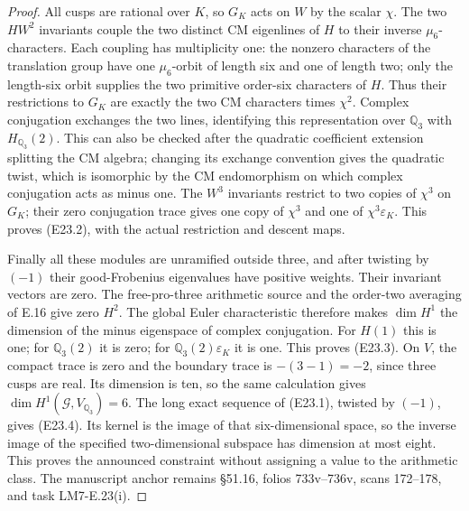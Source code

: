 \documentclass[11pt,oneside]{article}
\begin{document}
\begin{proof}
All cusps are rational over $K$, so $G_K$ acts on $W$ by
the scalar $\chi$. The two $HW^2$ invariants couple the
two distinct CM eigenlines of $H$ to their inverse
$\mu_6$-characters. Each coupling has multiplicity one:
the nonzero characters of the translation group have one
$\mu_6$-orbit of length six and one of length two; only
the length-six orbit supplies the two primitive order-six
characters of $H$. Thus their restrictions to $G_K$ are
exactly the two CM characters times $\chi^2$.
Complex conjugation exchanges the two lines, identifying
this representation over $\mathbb Q_3$ with
$H_{\mathbb Q_3}(2)$. This can also be checked after the
quadratic coefficient extension splitting the CM algebra;
changing its exchange convention gives the quadratic twist,
which is isomorphic by the CM endomorphism on which
complex conjugation acts as minus one.
The $W^3$ invariants restrict to two copies of $\chi^3$
on $G_K$; their zero conjugation trace gives one copy of
$\chi^3$ and one of $\chi^3\varepsilon_K$. This proves
(E23.2), with the actual restriction and descent maps.

Finally all these modules are unramified outside three,
and after twisting by $(-1)$ their good-Frobenius eigenvalues
have positive weights. Their invariant vectors are zero.
The free-pro-three arithmetic source and the order-two
averaging of E.16 give zero $H^2$. The global Euler
characteristic therefore makes $\dim H^1$ the dimension
of the minus eigenspace of complex conjugation.
For $H(1)$ this is one; for $\mathbb Q_3(2)$ it is zero;
for $\mathbb Q_3(2)\varepsilon_K$ it is one. This proves
(E23.3). On $V$, the compact trace is zero and the boundary
trace is $-(3-1)=-2$, since three cusps are real.
Its dimension is ten, so the same calculation gives
$\dim H^1(\mathcal G,V_{\mathbb Q_3})=6$.
The long exact sequence of (E23.1), twisted by $(-1)$,
gives (E23.4). Its kernel is the image of that
six-dimensional space, so the inverse image of the
specified two-dimensional subspace has dimension at most
eight. This proves the announced constraint without
assigning a value to the arithmetic class. The manuscript
anchor remains \S51.16, folios 733v--736v, scans 172--178,
and task LM7-E.23(i).
\end{proof}
\end{document}

